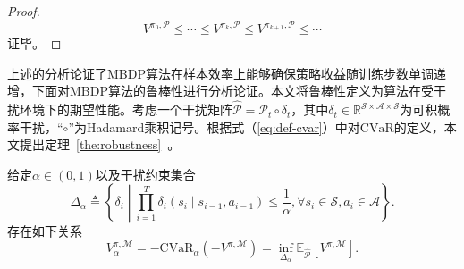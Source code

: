 \begin{proof}
\begin{equation}
{V}^{\pi_{0}, \mathcal{P}} \leq \cdots \leq {V}^{\pi_{k}, \mathcal{P}} \leq {V}^{\pi_{k+1}, \mathcal{P}} \leq \cdots
\end{equation}
证毕。
\end{proof}

上述的分析论证了MBDP算法在样本效率上能够确保策略收益随训练步数单调递增，下面对MBDP算法的鲁棒性进行分析论证。本文将鲁棒性定义为算法在受干扰环境下的期望性能。考虑一个干扰矩阵$\hat{\mathcal{P}}=\mathcal{P}_t \circ \delta_t$，其中$\delta_t\in\mathbb{R}^{\mathcal{S}\times\mathcal{A}\times\mathcal{S}}$为可积概率干扰，“$\circ$”为Hadamard乘积记号。根据式（\ref{eq:def-cvar}）中对$\mathrm{CVaR}$的定义，本文提出定理~\ref{the:robustness}~。

\begin{theorem}\label{the:robustness}
给定$\alpha\in(0,1)$以及干扰约束集合
\begin{equation}\label{eq:supp-perturbation}
    \Delta_\alpha \triangleq \left\{\delta_i\middle\vert\prod_{i=1}^{T}\delta_i(s_i\mid s_{i-1},a_{i-1})\leq \frac{1}{\alpha}, \forall s_i\in\mathcal{S}, a_i\in\mathcal{A}\right\}.
\end{equation}
存在如下关系
\begin{equation}\label{eq:return-cvar-rob}
    V_\alpha^{\pi,\mathcal{M}} = -\mathrm{CVaR}_\alpha\left(-V^{\pi,\mathcal{M}}\right)=\inf\limits_{\Delta_\alpha}\mathbb{E}_{\hat{\mathcal{P}}}\left[V^{\pi,\mathcal{M}}\right].
\end{equation}
\end{theorem}

